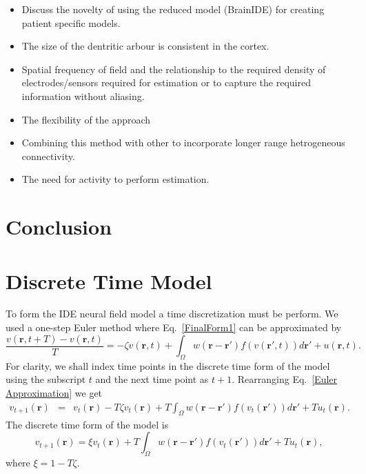\documentclass[12pt]{iopart}		%
\begin{document}
\begin{itemize}

	\item Discuss the novelty of using the reduced model (BrainIDE) for creating patient specific models. 
	\item The size of the dentritic arbour is consistent in the cortex.
	\item Spatial frequency of field and the relationship to the required density of electrodes/sensors required for estimation or to capture the required information without aliasing.
	
	\item The flexibility of the approach
	
	\item Combining this method with other to incorporate longer range hetrogeneous connectivity.
	
	\item The need for activity to perform estimation.
\end{itemize}

\section{Conclusion}
\appendix
\section{Discrete Time Model}\label{Time Discretization}
To form the IDE neural field model a time discretization must be perform. We used a one-step Euler method where Eq.~\ref{FinalForm1} can be approximated by
\begin{equation}\label{Euler Approximation}	
\frac{v\left( \mathbf{r},t+T \right) - v\left( \mathbf{r},t\right)}{T} =   -\zeta v\left( \mathbf{r},t \right) + \int_\Omega  {w\left( \mathbf{r}-\mathbf{r}' \right)f\left( {v\left( \mathbf{r}',t \right)} \right)d\mathbf{r}'} + u\left(\mathbf{r},t\right).
\end{equation}
For clarity, we shall index time points in the discrete time form of the model using the subscript $t$ and the next time point as $t+1$. Rearranging Eq.~\ref{Euler Approximation} we get
\begin{eqnarray}\label{Euler Approximation}	
v_{t+1}\left( \mathbf{r}\right) &=& v_t\left( \mathbf{r}\right) -T \zeta v_t\left( \mathbf{r}\right) + T \int_\Omega  {w\left( \mathbf{r}-\mathbf{r}' \right)f\left( {v_t\left( \mathbf{r}'\right)} \right)d\mathbf{r}'} + T u_t\left(\mathbf{r}\right).
\end{eqnarray}
The discrete time form of the model is
\begin{equation}\label{Discrete Time Model1}
	v_{t+1}\left(\mathbf{r}\right) = \xi v_t\left(\mathbf{r}\right) + T \int_\Omega { w\left(\mathbf{r}-\mathbf{r}'\right) f\left(v_t\left(\mathbf{r}'\right)\right) d\mathbf{r}'} + T u_t\left(\mathbf{r}\right),
\end{equation}
where $\xi = 1 - T \zeta$.
\end{document}

